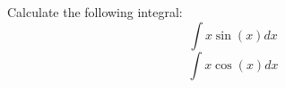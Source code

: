 \documentclass{exam}
\begin{document}
\begin{questions}
\begin{question}
Calculate the following integral:
\[
\int x \sin(x) dx
\]
\[
\int x \cos(x) dx
\]
\end{question}
\end{questions}
\end{document}
